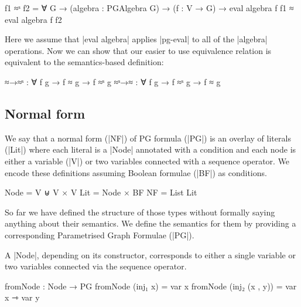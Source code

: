 
\begin{code}
f1 ≈ˢ f2 = 
   ∀ G → (algebra : PGAlgebra G) → (f : V → G) → 
   eval algebra f f1 ≈ eval algebra f f2 
\end{code}

Here we assume that |eval algebra| applies |pg-eval| to all of the |algebra| operations.
Now we can show that our easier to use equivalence relation is equivalent to the semantics-based definition:


\begin{code}
≈→≈ˢ : ∀ f g → f ≈ g → f ≈ˢ g
≈ˢ→≈ : ∀ f g → f ≈ˢ g → f ≈ g
\end{code}

\subsection{Normal form}


We say that a normal form (|NF|) of PG formula (|PG|) is an overlay of literals (|Lit|) where each literal is a |Node| annotated with a condition and each node is either a variable (|V|) or two variables connected with a sequence operator. We encode these definitions assuming Boolean formulae (|BF|) as conditions.

\begin{code}
Node = V ⊎ V × V
Lit = Node × BF
NF = List Lit
\end{code}

So far we have defined the structure of those types without formally saying anything about their semantics. We define the semantics for them by providing a corresponding Parametrised Graph Formulae (|PG|).


A |Node|, depending on its constructor, corresponds to either a single variable or two variables connected via the sequence operator.
\begin{code}
   fromNode : Node → PG
   fromNode (inj₁ x) = var x
   fromNode (inj₂ (x , y)) = var x ⇾ var y
\end{code}

